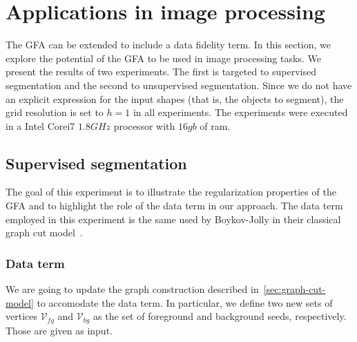 \documentclass[review]{siamart220329}
\begin{document}
\section{Applications in image processing}

The GFA can be extended to include a data fidelity term. In this section, we explore the potential of the GFA to be used in image processing tasks. We present the results of two experiments. The first is targeted to supervised segmentation and the second to unsupervised segmentation. Since we do not have an explicit expression for the input shapes (that is, the objects to segment), the grid resolution is set to $h=1$ in all experiments. The experiments were executed in a Intel Corei7 $1.8GHz$ processor with $16gb$ of ram.


\subsection{Supervised segmentation}

The goal of this experiment is to illustrate the regularization properties of the GFA and to highlight the role of the data term in our approach. The data term employed in this experiment is the same used by Boykov-Jolly in their classical graph cut model~\cite{boykov01graphcut}. 

\subsubsection{Data term}
We are going to update the graph construction described in~\cref{sec:graph-cut-model} to accomodate the data term. In particular, we define two new sets of vertices $\mathcal{V}_{fg}$ and $\mathcal{V}_{bg}$ as the set of foreground and background seeds, respectively. Those are given as input.
\end{document}
